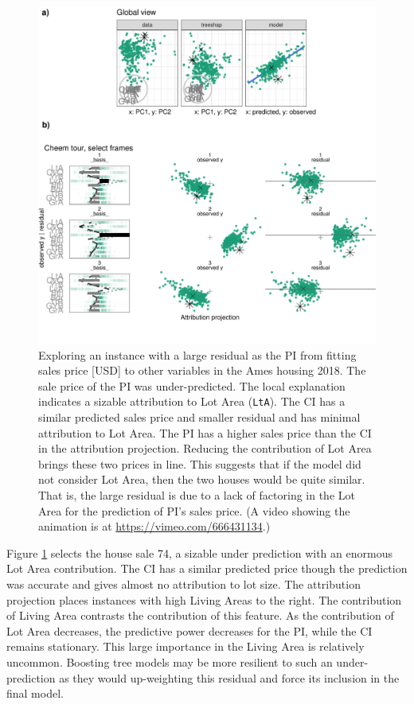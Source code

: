 \documentclass[11pt,twoside]{article}
\begin{document}
\begin{figure}

{\centering \includegraphics[width=0.9\linewidth]{./figures/case_ames2018} 

}

\caption{Exploring an instance with a large residual as the PI from fitting sales price {[}USD{]} to other variables in the Ames housing 2018. The sale price of the PI was under-predicted. The local explanation indicates a sizable attribution to Lot Area (\texttt{LtA}). The CI has a similar predicted sales price and smaller residual and has minimal attribution to Lot Area. The PI has
a higher sales price than the CI in the attribution projection. Reducing the contribution of Lot Area brings these two prices in line. This suggests that if the model did not consider Lot Area, then the two houses would be quite similar. That is, the large residual is due to a lack of factoring in the Lot Area for the prediction of PI's sales price. (A video showing the animation is at \url{https://vimeo.com/666431134}.)}\label{fig:caseames}
\end{figure}

Figure \ref{fig:caseames} selects the house sale 74, a sizable under prediction with an enormous Lot Area contribution. The CI has a similar predicted price though the prediction was accurate and gives almost no attribution to lot size. The attribution projection places instances with high Living Areas to the right. The contribution of Living Area contrasts the contribution of this feature. As the contribution of Lot Area decreases, the predictive power decreases for the PI, while the CI remains stationary. This large importance in the Living Area is relatively uncommon. Boosting tree models may be more resilient to such an under-prediction as they would up-weighting this residual and force its inclusion in the final model.
\end{document}
